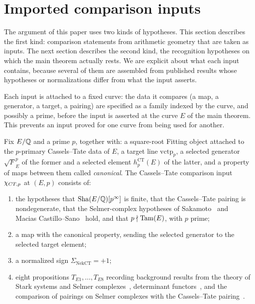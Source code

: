 \section{Imported comparison inputs}
\label{sec:imports}

The argument of this paper uses two kinds of hypotheses.  This section
describes the first kind: comparison statements from arithmetic geometry
that are taken as inputs.  The next section describes the second kind,
the recognition hypotheses on which the main theorem actually rests.  We
are explicit about what each input contains, because several of them are
assembled from published results whose hypotheses or normalizations
differ from what the input asserts.

Each input is attached to a fixed curve: the data it compares (a map, a
generator, a target, a pairing) are specified as a family indexed by the
curve, and possibly a prime, before the input is asserted at the curve
$E$ of the main theorem.  This prevents an input proved for one curve
from being used for another.

\begin{definition}\label{def:closure:chi-ct-p-import}
Fix $E/\mathbb{Q}$ and a prime $p$, together with: a square-root Fitting object
attached to the $p$-primary Cassels--Tate data of $E$, a target line
$\mathrm{vctp}_p$, a selected generator $\sqrt{F}_E^p$ of the former and a
selected element $h_p^{\mathrm{CT}}(E)$ of the latter, and a property of
maps between them called \emph{canonical}.  The Cassels--Tate comparison
input $\chi_{CT,p}$ at $(E,p)$ consists of:
\begin{enumerate}
\item the hypotheses that $\operatorname{Sha}(E/\mathbb{Q})[p^\infty]$ is finite, that the
  Cassels--Tate pairing is nondegenerate, that the Selmer-complex
  hypotheses of Sakamoto~\citep{Sakamoto2018} and Macias
  Castillo--Sano~\citep{MaciasCastilloSano2026} hold, and that
  $p\nmid\operatorname{Tam}(E)$, with $p$ prime;
\item a map with the canonical property, sending the selected generator
  to the selected target element;
\item a normalized sign $\Sigma_{\mathrm{NekCT}}=+1$;
\item eight propositions $T_{E1},\dots,T_{E8}$ recording background
  results from the theory of Stark systems and Selmer
  complexes~\citep{Sakamoto2018,MaciasCastilloSano2026}, determinant
  functors~\citep{KnudsenMumford1976}, and the comparison of pairings on
  Selmer complexes with the Cassels--Tate
  pairing~\citep{Nekovar2006,Flach1990,FisherSchaeferStoll2010}.
\end{enumerate}
\end{definition}

